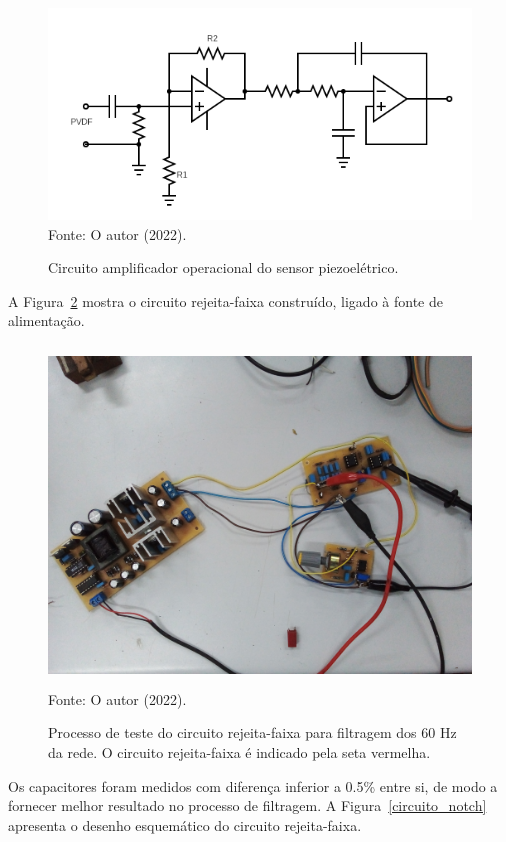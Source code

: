 \documentclass[
	12pt,				
	oneside,			
	a4paper,			
	english,			
	brazil,	
	sumario=abnt-6027-2012		
	]{abntex2ppgsi}
\begin{document}
\begin{figure}[H]
\centering
\caption {Circuito amplificador operacional do sensor piezoelétrico.}
\includegraphics[width=\textwidth,height=\textheight,keepaspectratio]{circuito_novo_certo_sem_valores} \\
Fonte: O autor (2022).
\label{circuito_novo_certo}
\end{figure} 

A Figura~\ref{circuito_rejeita_faixa} mostra o circuito rejeita-faixa construído, ligado à fonte de alimentação. 

\begin{figure}[H]
\centering
\caption {Processo de teste do circuito rejeita-faixa para filtragem dos 60 Hz da rede. O circuito rejeita-faixa é indicado pela seta vermelha.}
\includegraphics[width=\textwidth,height=90mm,keepaspectratio]{circuito_rejeita_faixa} \\
Fonte: O autor (2022).
\label{circuito_rejeita_faixa}
\end{figure} 

Os capacitores foram medidos com diferença inferior a 0.5\% entre si, de modo a fornecer melhor resultado no processo de filtragem. A Figura~\ref{circuito_notch} apresenta o desenho esquemático do circuito rejeita-faixa.
\end{document}
